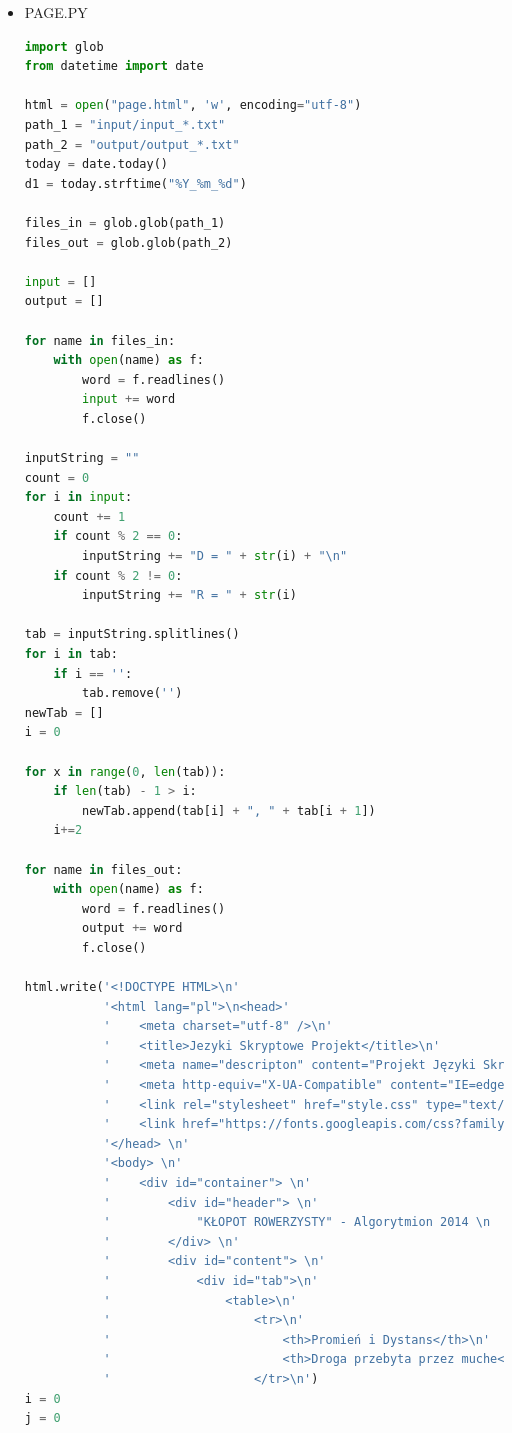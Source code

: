 \documentclass[12pt,a4paper]{article}
\begin{document}
\begin{itemize}
	\item PAGE.PY
	\begin{lstlisting}[language=Python]
import glob
from datetime import date

html = open("page.html", 'w', encoding="utf-8")
path_1 = "input/input_*.txt"
path_2 = "output/output_*.txt"
today = date.today()
d1 = today.strftime("%Y_%m_%d")

files_in = glob.glob(path_1)
files_out = glob.glob(path_2)

input = []
output = []

for name in files_in:
    with open(name) as f:
        word = f.readlines()
        input += word
        f.close()

inputString = ""
count = 0
for i in input:
    count += 1
    if count % 2 == 0:
        inputString += "D = " + str(i) + "\n"
    if count % 2 != 0:
        inputString += "R = " + str(i)

tab = inputString.splitlines()
for i in tab:
    if i == '':
        tab.remove('')
newTab = []
i = 0

for x in range(0, len(tab)):
    if len(tab) - 1 > i:
        newTab.append(tab[i] + ", " + tab[i + 1])
    i+=2

for name in files_out:
    with open(name) as f:
        word = f.readlines()
        output += word
        f.close()

html.write('<!DOCTYPE HTML>\n'
           '<html lang="pl">\n<head>'
           '    <meta charset="utf-8" />\n'
           '    <title>Jezyki Skryptowe Projekt</title>\n'
           '    <meta name="descripton" content="Projekt Języki Skryptowe Arkadiusz Kałuża"/>\n'
           '    <meta http-equiv="X-UA-Compatible" content="IE=edge,chrome=1"/> \n'
           '    <link rel="stylesheet" href="style.css" type="text/css" /> \n'
           '    <link href="https://fonts.googleapis.com/css?family=Lato&display=swap" rel="stylesheet"> \n'
           '</head> \n'
           '<body> \n'
           '    <div id="container"> \n'
           '        <div id="header"> \n'
           '            "KŁOPOT ROWERZYSTY" - Algorytmion 2014 \n         '
           '        </div> \n'
           '        <div id="content"> \n'
           '            <div id="tab">\n'
           '                <table>\n'
           '                    <tr>\n'
           '                        <th>Promień i Dystans</th>\n'
           '                        <th>Droga przebyta przez muche</th>\n'
           '                    </tr>\n')
i = 0
j = 0



\end{lstlisting}
\end{itemize}
\end{document}
